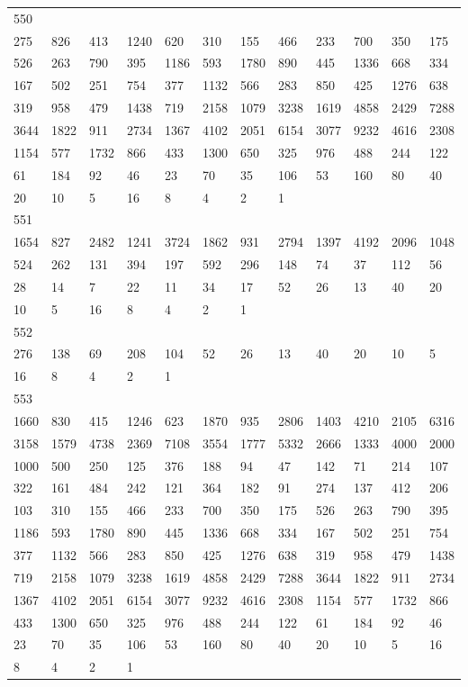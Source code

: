 \begin{longtable}{llllllllllll}
550&&&&&&&&&&&\\
275& 826& 413& 1240& 620& 310& 155& 466& 233& 700& 350& 175\\
526& 263& 790& 395& 1186& 593& 1780& 890& 445& 1336& 668& 334\\
167& 502& 251& 754& 377& 1132& 566& 283& 850& 425& 1276& 638\\
319& 958& 479& 1438& 719& 2158& 1079& 3238& 1619& 4858& 2429& 7288\\
3644& 1822& 911& 2734& 1367& 4102& 2051& 6154& 3077& 9232& 4616& 2308\\
1154& 577& 1732& 866& 433& 1300& 650& 325& 976& 488& 244& 122\\
61& 184& 92& 46& 23& 70& 35& 106& 53& 160& 80& 40\\
20& 10& 5& 16& 8& 4& 2& 1& \\

551&&&&&&&&&&&\\
1654& 827& 2482& 1241& 3724& 1862& 931& 2794& 1397& 4192& 2096& 1048\\
524& 262& 131& 394& 197& 592& 296& 148& 74& 37& 112& 56\\
28& 14& 7& 22& 11& 34& 17& 52& 26& 13& 40& 20\\
10& 5& 16& 8& 4& 2& 1& \\

552&&&&&&&&&&&\\
276& 138& 69& 208& 104& 52& 26& 13& 40& 20& 10& 5\\
16& 8& 4& 2& 1& \\

553&&&&&&&&&&&\\
1660& 830& 415& 1246& 623& 1870& 935& 2806& 1403& 4210& 2105& 6316\\
3158& 1579& 4738& 2369& 7108& 3554& 1777& 5332& 2666& 1333& 4000& 2000\\
1000& 500& 250& 125& 376& 188& 94& 47& 142& 71& 214& 107\\
322& 161& 484& 242& 121& 364& 182& 91& 274& 137& 412& 206\\
103& 310& 155& 466& 233& 700& 350& 175& 526& 263& 790& 395\\
1186& 593& 1780& 890& 445& 1336& 668& 334& 167& 502& 251& 754\\
377& 1132& 566& 283& 850& 425& 1276& 638& 319& 958& 479& 1438\\
719& 2158& 1079& 3238& 1619& 4858& 2429& 7288& 3644& 1822& 911& 2734\\
1367& 4102& 2051& 6154& 3077& 9232& 4616& 2308& 1154& 577& 1732& 866\\
433& 1300& 650& 325& 976& 488& 244& 122& 61& 184& 92& 46\\
23& 70& 35& 106& 53& 160& 80& 40& 20& 10& 5& 16\\
8& 4& 2& 1& \\


\end{longtable}
